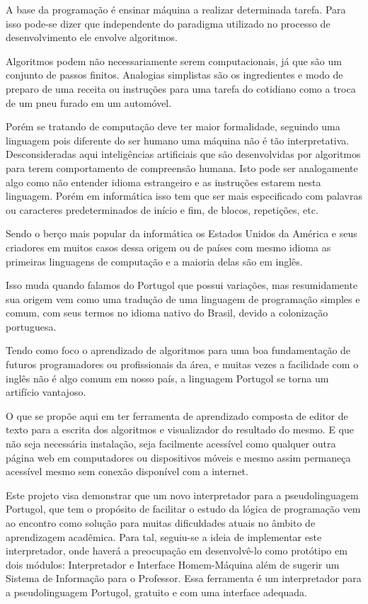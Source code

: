 
A base da programação é ensinar máquina a realizar determinada tarefa. Para isso
pode-se dizer que independente do paradigma utilizado no processo de
desenvolvimento ele envolve algoritmos.

Algoritmos podem não necessariamente serem computacionais, já que são um
conjunto de passos finitos. Analogias simplistas são os ingredientes e modo de
preparo de uma receita ou instruções para uma tarefa do cotidiano como a troca
de um pneu furado em um automóvel.

Porém se tratando de computação deve ter maior formalidade, seguindo uma linguagem
pois diferente do ser humano uma máquina não é tão interpretativa.
Desconsideradas aqui inteligências artificiais que são desenvolvidas por
algoritmos para terem  comportamento de compreensão humana. Isto pode ser
analogamente algo como não entender idioma estrangeiro e as instruções estarem
nesta linguagem. Porém em informática isso tem que ser mais especificado com
palavras ou caracteres predeterminados de início e fim, de blocos, repetições,
etc.

Sendo o berço mais popular da informática os Estados Unidos da América e seus
criadores em muitos casos dessa origem ou de países com mesmo idioma as
primeiras linguagens de computação e a maioria delas são em inglês.

Isso muda quando falamos do Portugol que possui variações, mas resumidamente
sua origem vem como uma tradução de uma linguagem de programação simples e comum,
com seus termos no idioma nativo do Brasil, devido a colonização
portuguesa.

Tendo como foco o aprendizado de algoritmos para uma boa fundamentação de
futuros programadores ou profissionais da área, e muitas vezes a facilidade com
o inglês não é algo comum em nosso país, a linguagem Portugol se torna um
artifício vantajoso.

O que se propõe aqui em ter ferramenta de aprendizado composta de editor de
texto para a escrita dos algoritmos e visualizador do resultado do mesmo.
E que não seja necessária instalação, seja facilmente acessível como qualquer
outra página web em computadores ou dispositivos móveis e mesmo assim permaneça
acessível mesmo sem conexão disponível com a internet.

Este projeto visa demonstrar que um novo interpretador para a pseudolinguagem
Portugol, que tem o propósito de facilitar o estudo da lógica de programação vem
ao encontro como solução para muitas dificuldades atuais no âmbito de
aprendizagem acadêmica. Para tal, seguiu-se a ideia de implementar este
interpretador, onde haverá a preocupação em desenvolvê-lo como protótipo em dois
módulos: Interpretador e Interface Homem-Máquina além de sugerir um Sistema de
Informação para o Professor. Essa ferramenta é um interpretador para a
pseudolinguagem Portugol, gratuito e com uma interface adequada.
